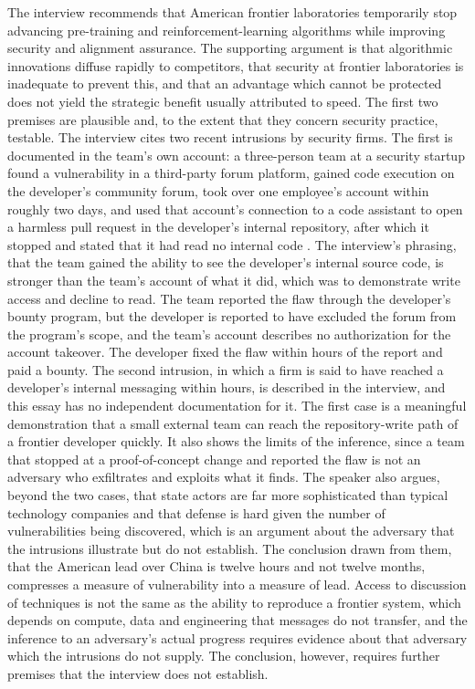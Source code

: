 \documentclass[11pt]{article}
\begin{document}
The interview recommends that American frontier laboratories temporarily stop advancing pre-training and reinforcement-learning algorithms while improving security and alignment assurance. The supporting argument is that algorithmic innovations diffuse rapidly to competitors, that security at frontier laboratories is inadequate to prevent this, and that an advantage which cannot be protected does not yield the strategic benefit usually attributed to speed. The first two premises are plausible and, to the extent that they concern security practice, testable. The interview cites two recent intrusions by security firms. The first is documented in the team's own account: a three-person team at a security startup found a vulnerability in a third-party forum platform, gained code execution on the developer's community forum, took over one employee's account within roughly two days, and used that account's connection to a code assistant to open a harmless pull request in the developer's internal repository, after which it stopped and stated that it had read no internal code \cite{hacktron2026}. The interview's phrasing, that the team gained the ability to see the developer's internal source code, is stronger than the team's account of what it did, which was to demonstrate write access and decline to read. The team reported the flaw through the developer's bounty program, but the developer is reported to have excluded the forum from the program's scope, and the team's account describes no authorization for the account takeover. The developer fixed the flaw within hours of the report and paid a bounty. The second intrusion, in which a firm is said to have reached a developer's internal messaging within hours, is described in the interview, and this essay has no independent documentation for it. The first case is a meaningful demonstration that a small external team can reach the repository-write path of a frontier developer quickly. It also shows the limits of the inference, since a team that stopped at a proof-of-concept change and reported the flaw is not an adversary who exfiltrates and exploits what it finds. The speaker also argues, beyond the two cases, that state actors are far more sophisticated than typical technology companies and that defense is hard given the number of vulnerabilities being discovered, which is an argument about the adversary that the intrusions illustrate but do not establish. The conclusion drawn from them, that the American lead over China is twelve hours and not twelve months, compresses a measure of vulnerability into a measure of lead. Access to discussion of techniques is not the same as the ability to reproduce a frontier system, which depends on compute, data and engineering that messages do not transfer, and the inference to an adversary's actual progress requires evidence about that adversary which the intrusions do not supply. The conclusion, however, requires further premises that the interview does not establish.
\end{document}

